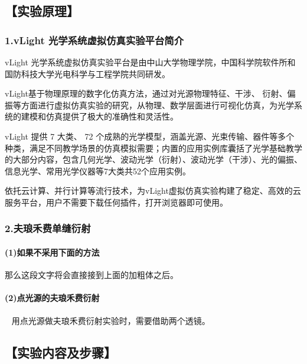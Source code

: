 \documentclass[12pt,a4paper,UTF8,fontset=fandol]{ctexart}
\begin{document}
\subsection*{【实验原理】}

	\subsubsection*{1.vLight 光学系统虚拟仿真实验平台简介}
	vLight 光学系统虚拟仿真实验平台是由中山大学物理学院，中国科学院软件所和国防科技大学光电科学与工程学院共同研发。\par
	vLight基于物理原理的数字化仿真方法，通过对光源物理特征、干涉、 衍射、偏振等方面进行虚拟仿真实验的研究，从物理、数学层面进行可视化仿真，为光学系统的建模和仿真提供了极大的准确性和灵活性。 

	vLight 提供 7 大类、 72 个成熟的光学模型，涵盖光源、光束传输、器件等多个种类，满足不同教学场景的仿真模拟需要；内置的应用实例库囊括了光学基础教学的大部分内容，包含几何光学、波动光学（衍射）、波动光学（干涉）、光的偏振、信息光学、常用光学仪器等7大类共52个应用实例。

	依托云计算、并行计算等流行技术，为vLight虚拟仿真实验构建了稳定、高效的云服务平台，用户不需要下载任何插件，打开浏览器即可使用。


	\subsubsection*{2.夫琅禾费单缝衍射}
	\paragraph{(1)如果不采用下面的方法}
	那么这段文字将会直接接到上面的加粗体之后。
	\paragraph{(2)点光源的夫琅禾费衍射}~
	\newline %
	\indent 用点光源做夫琅禾费衍射实验时，需要借助两个透镜。


\subsection*{【实验内容及步骤】}
\end{document}
